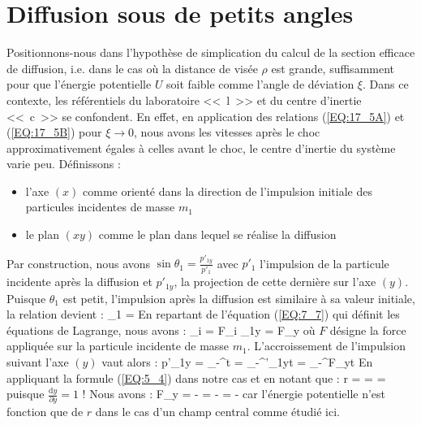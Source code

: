 \section{Diffusion sous de petits angles}

Positionnons-nous dans l'hypoth\`ese de simplication du calcul de la section efficace de diffusion, i.e. dans le cas o\`u la distance de vis\'ee $\rho$ est grande, suffisamment pour que l'\'energie potentielle $U$ soit faible comme l'angle de d\'eviation $\xi$. Dans ce contexte, les r\'ef\'erentiels du laboratoire <<~l~>> et du centre d'inertie <<~c~>> se confondent. En effet, en application des relations (\ref{EQ:17_5A}) et (\ref{EQ:17_5B}) pour $\xi \rightarrow 0$, nous avons les vitesses apr\`es le choc approximativement \'egales \`a celles avant le choc, le centre d'inertie du syst\`eme varie peu.
D\'efinissons :
\begin{itemize}
	\item l'axe $(x)$ comme orient\'e dans la direction de l'impulsion initiale des particules incidentes de masse $m_{1}$
	\item le plan $(xy)$ comme le plan dans lequel se r\'ealise la diffusion
\end{itemize}
Par construction, nous avons $\sin\theta_{1} = \frac{p'_{1y}}{p'_{1}}$ avec $p'_{1}$ l'impulsion de la particule incidente apr\`es la diffusion et $p'_{1y}$, la projection de cette derni\`ere sur l'axe $(y)$. Puisque $\theta_{1}$ est petit, l'impulsion apr\`es la diffusion est similaire \`a sa valeur initiale, la relation devient :
\be
	\theta_{1} =  \label{EQ:20_1}
\ee
En repartant de l'\'equation (\ref{EQ:7_7}) qui d\'efinit les \'equations de Lagrange, nous avons :
\benn
	_{i} = F_{i} \Leftrightarrow {}_{1y} = F_{y}
\eenn
o\`u $F$ d\'esigne la force appliqu\'ee sur la particule incidente de masse $m_{1}$. L'accroissement de l'impulsion suivant l'axe $(y)$ vaut alors :
\be
	p'_{1y} = \int_{-\infty}^{\infty}t = \int_{-\infty}^{\infty}'_{1y}t = \int_{-\infty}^{\infty}F_{y}t \label{EQ:20_2}
\ee
En appliquant la formule (\ref{EQ:5_4}) dans notre cas et en notant que :
\benn
	r =  \Rightarrow {} =  = 
\eenn
puisque $\frac{\mathrm{d}y}{\partial y} = 1$ ! Nous avons :
\benn
	F_{y} = - = - = -
\eenn
car l'\'energie potentielle n'est fonction que de $r$ dans le cas d'un champ central comme \'etudi\'e ici.


